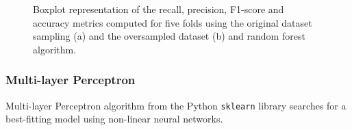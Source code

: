 \begin{figure}[H]
\centering
  \qquad
\caption{Boxplot representation of the recall, precision, F1-score and accuracy metrics computed for five folds using the original dataset sampling (a) and the oversampled dataset (b) and random forest algorithm.}
\label{figure_metrics_RF}
\end{figure}

\subsubsection{Multi-layer Perceptron}
Multi-layer Perceptron algorithm from the Python \texttt{sklearn} library searches for a best-fitting 
model using non-linear neural networks.\\

